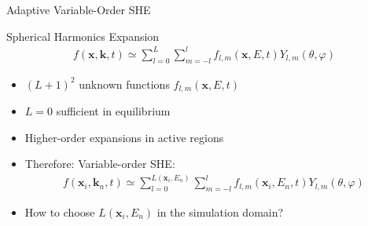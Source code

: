 \documentclass[usepdftitle=false,10pt]{beamer}
\renewcommand{\vector}[1]{\boldsymbol{#1}}
\begin{document}
\begin{frame}{Adaptive Variable-Order SHE}

  \vspace*{-0.05cm}
  \begin{block}{Spherical Harmonics Expansion}
     \vspace*{-0.6cm}
      { \begin{align*}
	f(\vector x, \vector k, t) \simeq \sum_{l = 0}^L \sum_{m=-l}^l f_{l,m}(\vector x, E, t) Y_{l,m}(\theta, \varphi)
      \end{align*}}
     \vspace*{-0.6cm}
  \end{block}

  \begin{itemize}
   \item $(L+1)^2$ unknown functions $f_{l,m}(\vector x, E, t)$
   \item $L=0$ sufficient in equilibrium
   \item Higher-order expansions in active regions
   \item Therefore: Variable-order SHE:
      { \Large \begin{align*}
	f(\vector x_i, \vector k_n, t) \simeq \sum_{l = 0}^{L(\vector x_i, E_n)} \sum_{m=-l}^l f_{l,m}(\vector x_i, E_n, t) Y_{l,m}(\theta, \varphi)
      \end{align*}}
   \item How to choose $L(\vector x_i, E_n)$ in the simulation domain?
  \end{itemize}
     \vspace*{0.92cm}
\end{frame}
\end{document}
